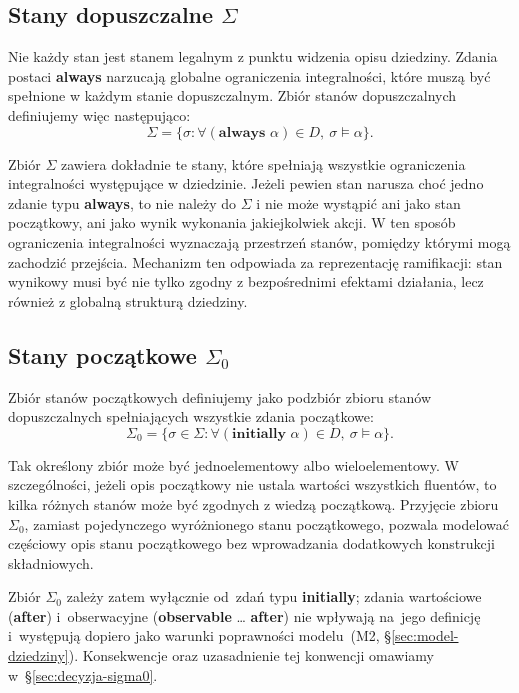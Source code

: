 \documentclass[11pt,a4paper]{article}
\newcommand{\aft}{\textbf{after}}
\newcommand{\initially}{\textbf{initially}}
\newcommand{\observable}{\textbf{observable}}
\theoremstyle{definition}
\begin{document}
\subsection{Stany dopuszczalne \texorpdfstring{$\Sigma$}{Sigma}}
\label{sec:stany-dopuszczalne}

Nie każdy stan jest stanem legalnym z punktu widzenia opisu dziedziny. Zdania postaci \textbf{always} narzucają globalne ograniczenia integralności, które muszą być spełnione w każdym stanie dopuszczalnym. Zbiór stanów dopuszczalnych definiujemy więc następująco:
\[
\Sigma = \{\sigma : \forall (\textbf{always }\alpha)\in D,\ \sigma \models \alpha\}.
\]

Zbiór $\Sigma$ zawiera dokładnie te stany, które spełniają wszystkie ograniczenia integralności występujące w dziedzinie. Jeżeli pewien stan narusza choć jedno zdanie typu \textbf{always}, to nie należy do $\Sigma$ i nie może wystąpić ani jako stan początkowy, ani jako wynik wykonania jakiejkolwiek akcji. W ten sposób ograniczenia integralności wyznaczają przestrzeń stanów, pomiędzy którymi mogą zachodzić przejścia. Mechanizm ten odpowiada za reprezentację ramifikacji: stan wynikowy musi być nie tylko zgodny z bezpośrednimi efektami działania, lecz również z globalną strukturą dziedziny.

\subsection{Stany początkowe \texorpdfstring{$\Sigma_0$}{Sigma\_0}}
\label{sec:stany-poczatkowe}

Zbiór stanów początkowych definiujemy jako podzbiór zbioru stanów dopuszczalnych spełniających wszystkie zdania początkowe:
\[
\Sigma_0 = \{\sigma \in \Sigma : \forall (\textbf{initially }\alpha)\in D,\ \sigma \models \alpha\}.
\]

Tak określony zbiór może być jednoelementowy albo wieloelementowy. W szczególności, jeżeli opis początkowy nie ustala wartości wszystkich fluentów, to kilka różnych stanów może być zgodnych z wiedzą początkową. Przyjęcie zbioru $\Sigma_0$, zamiast pojedynczego wyróżnionego stanu początkowego, pozwala modelować częściowy opis stanu początkowego bez wprowadzania dodatkowych konstrukcji składniowych.

Zbiór $\Sigma_0$ zależy zatem wyłącznie od~zdań typu \initially{}; zdania wartościowe (\aft{}) i~obserwacyjne (\observable{} \ldots{} \aft{}) nie wpływają na~jego definicję i~występują dopiero jako warunki poprawności modelu~(M2, §\ref{sec:model-dziedziny}). Konsekwencje oraz uzasadnienie tej konwencji omawiamy w~§\ref{sec:decyzja-sigma0}.
\end{document}
